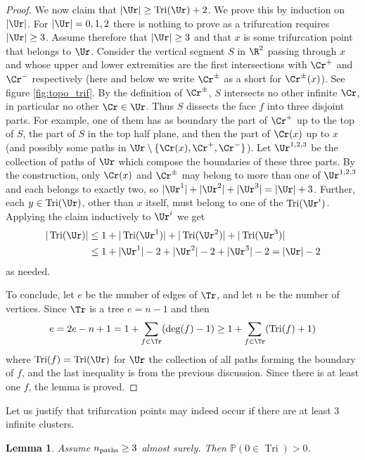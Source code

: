 \documentclass[12pt]{amsart}
\newcommand{\prob}{\mathbb{P}}
\DeclareMathOperator{\Tri}{Tri}
\newcommand{\npath}{n_{\rm paths}}
\newtheorem{lemma}{Lemma}
\theoremstyle{remark}
\begin{document}
\begin{proof}
We now claim that $|\Ur|\ge\Tri(\Ur)+2$.
We prove this by induction on $|\Ur|$. For $|\Ur|=0,1,2$ there is nothing to prove as a trifurcation requires $|\Ur|\ge 3$. Assume therefore that $|\Ur|\ge 3$ and that $x$ is some trifurcation point that belongs to $\Ur$. Consider the vertical segment $S$ in $\R^2$ passing through $x$ and whose upper and lower extremities are the first intersections with $\Cr^+$ and $\Cr^-$ respectively (here and below we write $\Cr^\pm$ as a short for $\Cr^\pm(x)$). See figure \ref{fig:topo_trif}. By the definition of $\Cr^\pm$, $S$ intersects no other infinite $\Cr$, in particular no other $\Cr\in\Ur$. Thus $S$ dissects the face $f$ into three disjoint parts. For example, one of them has as boundary the part of $\Cr^+$ up to the top of $S$, the part of $S$ in the top half plane, and then the part of $\Cr(x)$ up to $x$ (and possibly some paths in $\Ur\setminus\{\Cr(x),\Cr^+,\Cr^-\}$). Let $\Ur^{1,2,3}$ be the collection of paths of $\Ur$ which compose the boundaries of these three parts. By the construction, only $\Cr(x)$ and $\Cr^\pm$ may belong to more than one of $\Ur^{1,2,3}$ and each belongs to exactly two, so $|\Ur^1|+|\Ur^2|+|\Ur^3|=|\Ur|+3$. Further, each $y\in\Tri(\Ur)$, other than $x$ itself, must belong to one of the $\Tri(\Ur^i)$. Applying the claim inductively to $\Ur^i$ we get
\begin{align*}
  |\Tri(\Ur)|&\le 1+|\Tri(\Ur^1)|+|\Tri(\Ur^2)|+|\Tri(\Ur^3)|\\
    & \le 1+|\Ur^1|-2+|\Ur^2|-2+|\Ur^3|-2=|\Ur|-2
\end{align*}
as needed.

To conclude, let $e$ be the number of edges of $\Tr$, and let $n$ be the number of vertices. Since $\Tr$ is a tree $e=n-1$ and then
\[
e=2e-n+1=1+\sum_{f\in\Tr}(\deg(f)-1)\ge 1+\sum_{f\in\Tr}(\Tri(f)+1)
\]
where $\Tri(f)=\Tri(\Ur)$ for $\Ur$ the collection of all paths forming the boundary of $f$, and the last inequality is from the previous discussion. Since there is at least one $f$, the lemma is proved.
\end{proof}

Let us justify that trifurcation points may indeed occur if there are at least 3 infinite clusters. 

\begin{lemma}\label{lem:positive_trifurcation}
Assume $\npath\ge3$ almost surely. Then $\prob(0\in  \Tri)>0$. 
\end{lemma}
\end{document}
